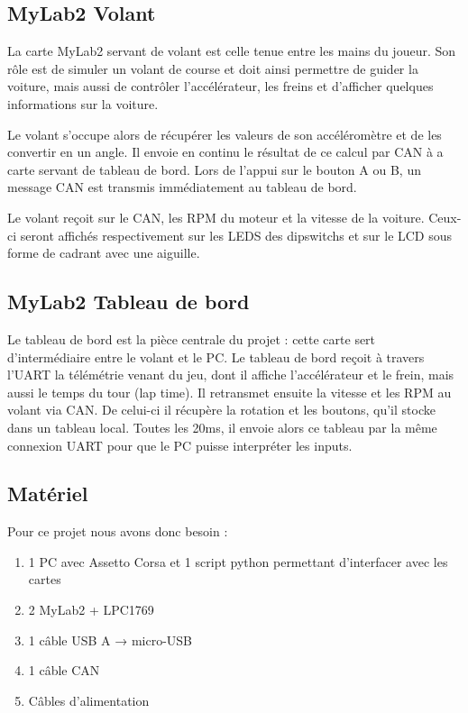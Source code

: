 \documentclass[french, 11pt]{article}
\begin{document}


        \subsection{MyLab2 Volant}

		La carte MyLab2 servant de volant est celle tenue entre les mains du joueur. Son rôle est de simuler un volant de course et doit ainsi permettre de guider la voiture, mais aussi de contrôler l'accélérateur, les freins et d'afficher quelques informations sur la voiture.

        Le volant s'occupe alors de récupérer les valeurs de son accéléromètre et de les convertir en un angle. Il envoie en continu le résultat de ce calcul par CAN à a carte servant de tableau de bord. Lors de l'appui sur le bouton A ou B, un message CAN est transmis immédiatement au tableau de bord. 
		
		Le volant reçoit sur le CAN, les RPM du moteur et la vitesse de la voiture. Ceux-ci seront affichés respectivement sur les LEDS des dipswitchs et sur le LCD sous forme de cadrant avec une aiguille.

        
        \subsection{MyLab2 Tableau de bord}

        Le tableau de bord est la pièce centrale du projet : cette carte sert d'intermédiaire entre le volant et le PC. Le tableau de bord reçoit à travers l'UART la télémétrie venant du jeu, dont il affiche l'accélérateur et le frein, mais aussi le temps du tour (lap time). Il retransmet ensuite la vitesse et les RPM au volant via CAN. De celui-ci il récupère la rotation et les boutons, qu'il stocke dans un tableau local. Toutes les 20ms, il envoie alors ce tableau par la même connexion UART pour que le PC puisse interpréter les inputs. 

        \subsection{Matériel}    

        Pour ce projet nous avons donc besoin :

        \begin{enumerate}
            \item 1 PC avec Assetto Corsa et 1 script python permettant d'interfacer avec les cartes
            \item 2 MyLab2 + LPC1769
            \item 1 câble USB A → micro-USB
            \item 1 câble CAN
            \item Câbles d'alimentation
        \end{enumerate}
\end{document}
